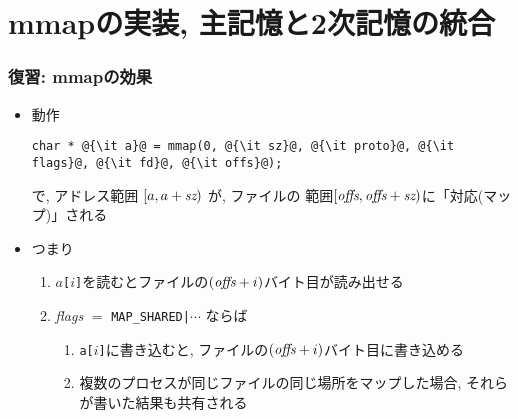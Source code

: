 \documentclass[12pt,dvipdfmx]{beamer}
\begin{document}
\iffalse
\begin{frame}
  \frametitle{キャッシュ, 先読みの動作とアプリケーション性能への帰結}
  \begin{itemize}
  \item 以下のようなアプリケーションの性能について注意が必要
  \item 巨大: 扱うデータが巨大で主記憶に全て収まらない(または収めたくないほどには大きい)
  \item 索引: 全てのデータをアクセスせずに処理を
  \end{itemize}
\end{frame}
\fi

\section{mmapの実装, 主記憶と2次記憶の統合}

\begin{frame}[fragile]
  \frametitle{復習: mmapの効果}
  \begin{itemize}
  \item 動作
\begin{lstlisting}
char * @{\it a}@ = mmap(0, @{\it sz}@, @{\it proto}@, @{\it flags}@, @{\it fd}@, @{\it offs}@);
\end{lstlisting}
で, アドレス範囲 $[a, a+\mbox{\it sz})$ が, ファイルの
範囲$[\mbox{\it offs}, \mbox{\it offs} + \mbox{\it sz})$に「対応(マップ)」される
\item つまり
  \begin{enumerate}
  \item {\tt $a$[$i$]}を読むとファイルの$(\mbox{\it offs} + i)$バイト目が読み出せる
  \item {\it flags} $=$ {\tt MAP\_SHARED|$\cdots$} ならば
    \begin{enumerate}
    \item {\tt a[$i$]}に書き込むと,
      ファイルの$(\mbox{\it offs} + i)$バイト目に書き込める
    \item 複数のプロセスが同じファイルの同じ場所をマップした場合,
      それらが書いた結果も共有される
    \end{enumerate}
  \end{enumerate}
  \end{itemize}
\end{frame}
\end{document}
